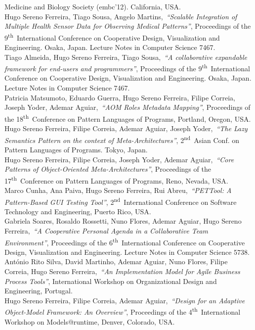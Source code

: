 \documentclass[9pt, a4paper, pstricks]{article}
\newcommand{\years}[1]{\marginnote{\small #1}}
\newcommand{\nth}{\textsuperscript{th}~}
\newcommand{\nd}{\textsuperscript{nd}~}
\begin{document}
Medicine and Biology Society ({\sc embc}'12). California, USA.\\
\years{2012}Hugo Sereno Ferreira, Tiago Sousa, Angelo Martins,~\emph{``Scalable Integration of Multiple Health Sensor Data for Observing Medical Patterns''}, Proceedings of the 9\nth International Conference on Cooperative Design, Visualization and Engineering. Osaka, Japan. Lecture Notes in Computer Science 7467.\\
\years{2012}Tiago Almeida, Hugo Sereno Ferreira, Tiago Sousa,~\emph{``A collaborative expandable framework for end-users and programmers''}, Proceedings of the 9\nth International Conference on Cooperative Design, Visualization and Engineering. Osaka, Japan. Lecture Notes in Computer Science 7467.\\
\years{2011}Patricia Matsumoto, Eduardo Guerra, Hugo Sereno Ferreira, Filipe Correia, Joseph Yoder, Ademar Aguiar,~\emph{``AOM Roles Metadata Mapping''}, Proceedings of the 18\nth Conference on Pattern Languages of Programs, Portland, Oregon, USA.\\
\years{2011}Hugo Sereno Ferreira, Filipe Correia, Ademar Aguiar, Joseph Yoder,~\emph{``The Lazy Semantics Pattern on the context of Meta-Architectures''}, 2\nd Asian Conf. on Pattern Languages of Programs. Tokyo, Japan.\\
\years{2010}Hugo Sereno Ferreira, Filipe Correia, Joseph Yoder, Ademar Aguiar,~\emph{``Core Patterns of Object-Oriented Meta-Architectures''}, Proceedings of the 17\nth Conference on Pattern Languages of Programs, Reno, Nevada, USA.\\
\years{2010}Marco Cunha, Ana Paiva, Hugo Sereno Ferreira, Rui Abreu,~\emph{``PETTool: A Pattern-Based GUI Testing Tool''}, 2\nd International Conference on Software Technology and Engineering, Puerto Rico, USA.\\
\years{2009}Gabriela Soares, Rosaldo Rossetti, Nuno Flores, Ademar Aguiar, Hugo Sereno Ferreira,~\emph{``A Cooperative Personal Agenda in a Collaborative Team Environment''}, Proceedings of the 6\nth International Conference on Cooperative Design, Visualization and Engineering. Lecture Notes in Computer Science 5738.\\
\years{2009}António Rito Silva, David Martinho, Ademar Aguiar, Nuno Flores, Filipe Correia, Hugo Sereno Ferreira,~\emph{``An Implementation Model for Agile Business Process Tools''}, International Workshop on Organizational Design and Engineering, Portugal.\\
\years{2009}Hugo Sereno Ferreira, Filipe Correia, Ademar Aguiar,~\emph{``Design for an Adaptive Object-Model Framework: An Overview''}, Proceedings of the 4\nth International Workshop on Models@runtime, Denver, Colorado, USA.\\
\end{document}
